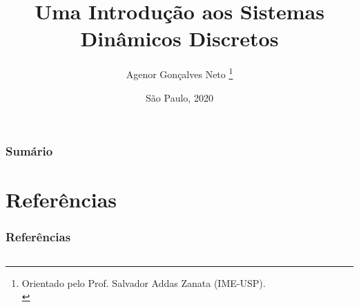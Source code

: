 \documentclass[11pt, portuguese, aspectratio=1610]{beamer}
\title{Uma Introdução aos Sistemas Dinâmicos Discretos}\author{Agenor Gonçalves Neto \footnote{Orientado pelo Prof. Salvador Addas Zanata (IME-USP).\\}}
\date{São Paulo, 2020}
\begin{document}

\begin{frame}
\titlepage
\end{frame}

\begin{frame}
\vspace{5pt}
\frametitle{Sumário}
\tableofcontents
\end{frame}











\section*{Referências}


\begin{frame}
\vspace{5pt}
\frametitle{Referências}
\begin{columns}
\column{\dimexpr\paperwidth-15pt}

\nocite{burns, devaney, holmgren}



\end{columns}
\end{frame}
\end{document}
